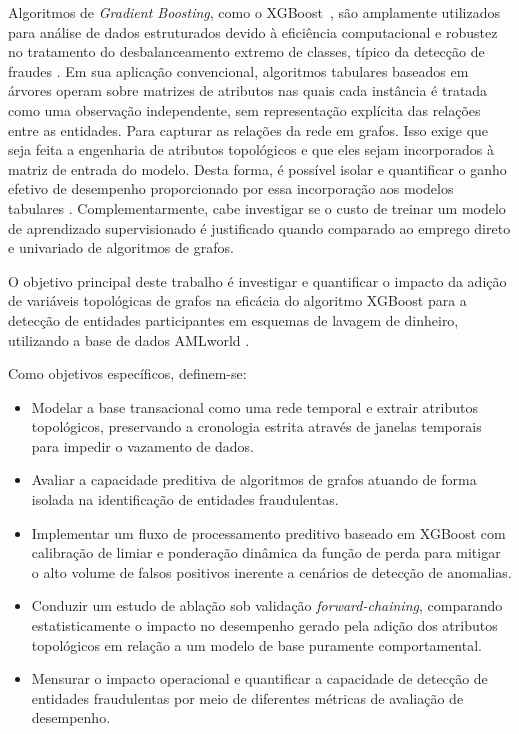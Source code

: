 \documentclass[titlepage,a4paper,oneside,onecolumn,12pt]{report}
\begin{document}
Algoritmos de \textit{Gradient Boosting}, como o XGBoost~\cite{chen2016xgboost}, são amplamente utilizados para análise de dados estruturados devido à eficiência computacional e robustez no tratamento do desbalanceamento extremo de classes, típico da detecção de fraudes \cite{alarab2020comparative}. Em sua aplicação convencional, algoritmos tabulares baseados em árvores operam sobre matrizes de atributos nas quais cada instância é tratada como uma observação independente, sem representação explícita das relações entre as entidades. Para capturar as relações da rede em grafos. Isso exige que seja feita a engenharia de atributos topológicos e que eles sejam incorporados à matriz de entrada do modelo. Desta forma, é possível isolar e quantificar o ganho efetivo de desempenho proporcionado por essa incorporação aos modelos tabulares \cite{karim2024scalable}. Complementarmente, cabe investigar se o custo de treinar um modelo de aprendizado supervisionado é justificado quando comparado ao emprego direto e univariado de algoritmos de grafos.

O objetivo principal deste trabalho é investigar e quantificar o impacto da adição de variáveis topológicas de grafos na eficácia do algoritmo XGBoost para a detecção de entidades participantes em esquemas de lavagem de dinheiro, utilizando a base de dados AMLworld \cite{altman2023realistic}.

Como objetivos específicos, definem-se:
\begin{itemize}
    \item Modelar a base transacional como uma rede temporal e extrair atributos topológicos, preservando a cronologia estrita através de janelas temporais para impedir o vazamento de dados.
    \item Avaliar a capacidade preditiva de algoritmos de grafos atuando de forma isolada na identificação de entidades fraudulentas.
    \item Implementar um fluxo de processamento preditivo baseado em XGBoost com calibração de limiar e ponderação dinâmica da função de perda para mitigar o alto volume de falsos positivos inerente a cenários de detecção de anomalias.
    \item Conduzir um estudo de ablação sob validação \textit{forward-chaining}, comparando estatisticamente o impacto no desempenho gerado pela adição dos atributos topológicos em relação a um modelo de base puramente comportamental.
    \item Mensurar o impacto operacional e quantificar a capacidade de detecção de entidades fraudulentas por meio de diferentes métricas de avaliação de desempenho.
\end{itemize}
\end{document}
